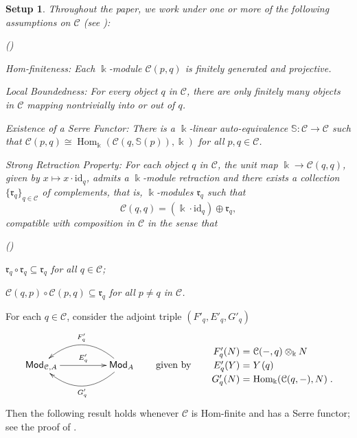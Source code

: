 \documentclass{amsart}
\theoremstyle{bfupright head,slanted body}
\theoremstyle{bfupright head,upright body}
\theoremstyle{fixed bf head,slanted body}
\theoremstyle{fixed bf head,upright body}
\newtheorem{setup}[res]{Setup}           \newtheorem*{setup*}{Setup}
\theoremstyle{numbered paragraph}
\newlength{\thmlistleft}        %
\newlength{\thmlistright}       %
\newlength{\thmlistpartopsep}   %
\newlength{\thmlisttopsep}      %
\newlength{\thmlistparsep}      %
\newlength{\thmlistitemsep}     %
\newcounter{eqc}
\newenvironment{eqc}{\begin{list}{\upshape (\textit{\roman{eqc}})}%
		{\usecounter{eqc}%
			\setlength{\leftmargin}{\thmlistleft}%
			\setlength{\labelwidth}{\thmlistleft}%
			\setlength{\rightmargin}{\thmlistright}%
			\setlength{\partopsep}{\thmlistpartopsep}%
			\setlength{\topsep}{\thmlisttopsep}%
			\setlength{\parsep}{\thmlistparsep}%
			\setlength{\itemsep}{\thmlistitemsep}}}%
	{\end{list}}%
\newcounter{rqm}
\newenvironment{rqm}{\begin{list}{\upshape (\arabic{rqm})}%
		{\usecounter{rqm}%
			\setlength{\leftmargin}{\thmlistleft}%
			\setlength{\labelwidth}{\thmlistleft}%
			\setlength{\rightmargin}{\thmlistright}%
			\setlength{\partopsep}{\thmlistpartopsep}%
			\setlength{\topsep}{\thmlisttopsep}%
			\setlength{\parsep}{\thmlistparsep}%
			\setlength{\itemsep}{\thmlistitemsep}}}%
	{\end{list}}%
\numberwithin{equation}{res}
\newcommand{\Hom}[3][]{\operatorname{Hom}_{#1}(#2,#3)}
\newcommand{\C}{\mathcal{C}}
\newcommand{\id}{\mathrm{id}}
\newcommand{\kk}{\Bbbk}
\newcommand{\is}{\cong}
\newcommand{\rMod}[1]{{\sf{Mod}}_{#1}}
\begin{document}
\begin{setup}\label{setup}
Throughout the paper, we work under one or more of the following assumptions on $\C$ (see \cite{HJ21}):
\begin{rqm}
\item \emph{Hom-finiteness}: Each $\Bbbk$-module $\C(p,q)$ is finitely generated and
      projective.
\item \emph{Local Boundedness}: For every object $q$ in $\C$, there are only finitely many objects in $\C$ mapping nontrivially into or out of $q$.
\item \emph{Existence of a Serre Functor}: There is a $\Bbbk$-linear
      auto-equivalence $\mathbb{S}: \C \to \C$ such that $\C(p,q)\is\Hom[\Bbbk]{\C(q,\mathbb{S}(p))}{\Bbbk}$ for all $p,q\in\C$.
\item \emph{Strong Retraction Property}: For each object $q$ in $\C$, the unit map
      $\Bbbk\to \C(q,q)$, given by $x\mapsto x\cdot\id_q$, admits a $\Bbbk$-module retraction and there exists a collection $\{\mathfrak{r}_q\}_{q\in\C}$ of complements, that is, $\Bbbk$-modules $\mathfrak{r}_q$ such that
      \[\C(q,q)=(\Bbbk\cdot\id_q)\oplus\mathfrak{r}_q,\]
      compatible with composition in $\C$ in the sense that
    \begin{eqc}
    \item[($\dagger$)] $\mathfrak{r}_q\circ\mathfrak{r}_q\subseteq\mathfrak{r}_q$ for all $q\in\C$;
    \item[($\ddagger$)] $\C(q,p)\circ\C(p,q)\subseteq\mathfrak{r}_q$ for all $p\neq q$ in $\C$.
    \end{eqc}
\end{rqm}
\end{setup}

For each $q\in\C$, consider the adjoint triple $(F'_{q},E'_{q},G'_{q})$
  \begin{equation*}
  \xymatrix@C=4pc{
    \rMod{\C,A}
    \ar[r]^-{E'_{q}}
    &
    \rMod{A}
    \ar@/_1.8pc/[l]_-{F'_{q}}
    \ar@/^1.8pc/[l]^-{G'_{q}}
  }
  \qquad \text{given by} \qquad
  {\setlength\arraycolsep{1.5pt}
   \renewcommand{\arraystretch}{1.2}
  \begin{array}{rcl}
  F'_q(N) &=& \C(-,q) \otimes_\kk N \\
  E'_q(Y) &=& Y\mspace{1.5mu}(q) \\
  G'_{q}(N) &=& \Hom[\kk]{\C(q, -)}{N}\;.
  \end{array}
  }
  \end{equation*}
Then the following result holds whenever $\C$ is Hom-finite and has a Serre functor; see the proof of \cite[Lemma 3.8]{DLLM}.
\end{document}
